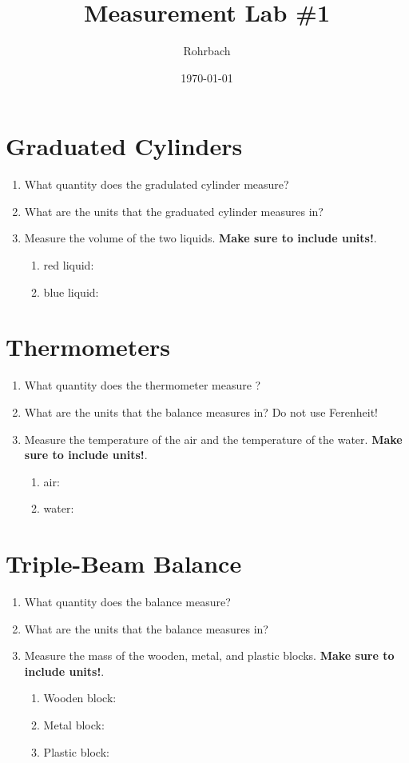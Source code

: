 \documentclass[10pt]{exam}
\title{Measurement Lab \#1}
\author{Rohrbach}
\date{\today}
\begin{document}
\maketitle

\section{Graduated Cylinders}
\begin{enumerate}
  \item What quantity does the gradulated cylinder measure? \vs
  \item What are the units that the graduated cylinder measures in? \vs
  \item Measure the volume of the two liquids. {\bf Make sure to include units!}.
    \begin{enumerate}
      \item red liquid:\vs
      \item blue liquid:\vs
    \end{enumerate}
\end{enumerate}

\section{Thermometers}
\begin{enumerate}
  \item What quantity does the thermometer measure ? \vs
  \item What are the units that the balance measures in?  Do not use Ferenheit! \vs
  \item Measure the temperature of the air and the temperature of the water. {\bf Make sure to include units!}.
    \begin{enumerate}
      \item air:\vs
      \item water:\vs
    \end{enumerate}
\end{enumerate}


\section{Triple-Beam Balance}
\begin{enumerate}
  \item What quantity does the balance measure? \vs
  \item What are the units that the balance measures in? \vs
  \item Measure the mass of the wooden, metal, and plastic blocks.  {\bf Make sure to include units!}.
    \begin{enumerate}
      \item Wooden block: \vs
      \item Metal block: \vs
      \item Plastic block: \vs
    \end{enumerate}
\end{enumerate}
\end{document}
